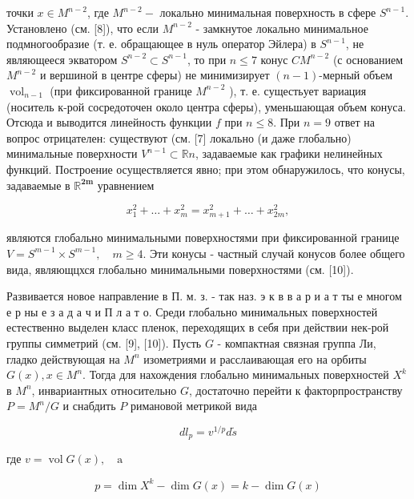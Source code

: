 \documentclass[10pt]{article}
\begin{document}
точки $x \in M^{n-2}$, где $M^{n-2}-$ локально минимальная поверхность в сфере $S^{n-1}$. Установлено (см. [8]), что если $M^{n-2}$ - замкнутое локально минимальное подмногообразие (т. е. обращающее в нуль оператор Эйлера) в $S^{n-1}$, не являющееся экватором $S^{n-2} \subset S^{n-1}$, то при $n \leqslant 7$ конус $C M^{n-2}$ (с основанием $M^{n-2}$ и вершиной в центре сферы) не минимизирует $(n-1)$-мерный объем $\operatorname{vol}_{n-1}$ (при фиксированной границе $M^{n-2}$ ), т. е. сущестьует вариация (носитель к-рой сосредоточен около центра сферы), уменьшающая объем конуса. Отсюда и выводится линейность функции $f$ при $n \leqslant 8$. При $n=9$ ответ на вопрос отрицателен: существуют (см. [7] локально (и даже глобально) минимальные поверхности $V^{n-1} \subset \mathbb{R} n$, задаваемые как графики нелинейных функций. Построение осуществляется явно; при этом обнаружилось, что конусы, задаваемые в $\mathbb{R}^{\mathbf{2 m}}$ уравнением



\[

x_{1}^{2}+\ldots+x_{m}^{2}=x_{m+1}^{2}+\ldots+x_{2 m}^{2},

\]



являются глобально минимальными поверхностями при фиксированной границе $V=S^{m-1} \times S^{m-1}, \quad m \geqslant 4$. Эти конусы - частный случай конусов более общего вида, являющцхся глобально минимальными поверхностями (см. [10]).



Развивается новое направление в П. м. з. - так наз. э к в в а р и а т ты е многом е р ны е з а д а ч и П л а т о. Среди глобально минимальных поверхностей естественно выделен класс пленок, переходящих в себя при действии нек-рой группы симметрий (см. [9], [10]). Пусть $G$ - компактная связная группа Ли, гладко действующая на $M^{n}$ изометриями и расслаивающая его на орбиты $G(x), x \in M^{n}$. Тогда для нахождения глобально минимальных поверхностей $X^{k}$ в $M^{n}$, инвариантных относительно $G$, достаточно перейти к факторпространству $P=M^{n} / G$ и снабдить $P$ римановой метрикой вида



\[

d l_{p}=v^{1 / p} d \tilde{s}

\]



где $v=\operatorname{vol} G(x), \quad \mathrm{a}$



\[

p=\operatorname{dim} X^{k}-\operatorname{dim} G(x)=k-\operatorname{dim} G(x)

\]
\end{document}
